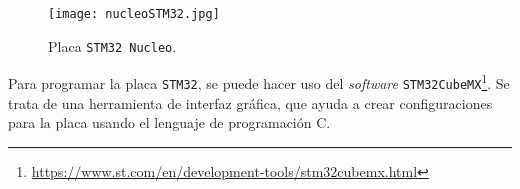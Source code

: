 \begin{enumerate}
\begin{figure}[H]
\begin{center}
\texttt{[image: nucleoSTM32.jpg]}
\caption[]{Placa \texttt{STM32 Nucleo}. \protect\footnotemark}
\label{fig:stm32}
\end{center}
\end{figure}


Para programar la placa \texttt{STM32}, se puede hacer uso del \textit{software} \texttt{STM32CubeMX}\footnote{\url{https://www.st.com/en/development-tools/stm32cubemx.html}}. Se trata de una herramienta de interfaz gráfica, que ayuda a crear configuraciones para la placa usando el lenguaje de programación C.  

\end{enumerate}


